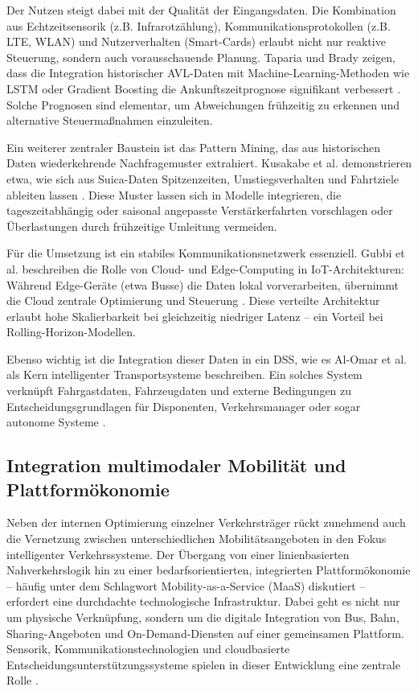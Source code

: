 Der Nutzen steigt dabei mit der Qualität der Eingangsdaten. Die Kombination aus Echtzeitsensorik (z.B. Infrarotzählung), Kommunikationsprotokollen (z.B. LTE, WLAN) und Nutzerverhalten (Smart-Cards) erlaubt nicht nur reaktive Steuerung, sondern auch vorausschauende Planung. Taparia und Brady zeigen, dass die Integration historischer AVL-Daten mit Machine-Learning-Methoden wie LSTM oder Gradient Boosting die Ankunftszeitprognose signifikant verbessert \cite{Taparia2021}. Solche Prognosen sind elementar, um Abweichungen frühzeitig zu erkennen und alternative Steuermaßnahmen einzuleiten.

Ein weiterer zentraler Baustein ist das Pattern Mining, das aus historischen Daten wiederkehrende Nachfragemuster extrahiert. Kusakabe et al. demonstrieren etwa, wie sich aus Suica-Daten Spitzenzeiten, Umstiegsverhalten und Fahrtziele ableiten lassen \cite{Kusakabe2010}. Diese Muster lassen sich in Modelle integrieren, die tageszeitabhängig oder saisonal angepasste Verstärkerfahrten vorschlagen oder Überlastungen durch frühzeitige Umleitung vermeiden.

Für die Umsetzung ist ein stabiles Kommunikationsnetzwerk essenziell. Gubbi et al. beschreiben die Rolle von Cloud- und Edge-Computing in IoT-Architekturen: Während Edge-Geräte (etwa Busse) die Daten lokal vorverarbeiten, übernimmt die Cloud zentrale Optimierung und Steuerung \cite{Gubbi2013}. Diese verteilte Architektur erlaubt hohe Skalierbarkeit bei gleichzeitig niedriger Latenz – ein Vorteil bei Rolling-Horizon-Modellen.

Ebenso wichtig ist die Integration dieser Daten in ein DSS, wie es Al-Omar et al. als Kern intelligenter Transportsysteme beschreiben. Ein solches System verknüpft Fahrgastdaten, Fahrzeugdaten und externe Bedingungen zu Entscheidungsgrundlagen für Disponenten, Verkehrsmanager oder sogar autonome Systeme \cite{AlOmar2012}.

\subsection{Integration multimodaler Mobilität und Plattformökonomie}

Neben der internen Optimierung einzelner Verkehrsträger rückt zunehmend auch die Vernetzung zwischen unterschiedlichen Mobilitätsangeboten in den Fokus intelligenter Verkehrssysteme. Der Übergang von einer linienbasierten Nahverkehrslogik hin zu einer bedarfsorientierten, integrierten Plattformökonomie – häufig unter dem Schlagwort Mobility-as-a-Service (MaaS) diskutiert – erfordert eine durchdachte technologische Infrastruktur. Dabei geht es nicht nur um physische Verknüpfung, sondern um die digitale Integration von Bus, Bahn, Sharing-Angeboten und On-Demand-Diensten auf einer gemeinsamen Plattform. Sensorik, Kommunikationstechnologien und cloudbasierte Entscheidungsunterstützungssysteme spielen in dieser Entwicklung eine zentrale Rolle \cite{M}.

